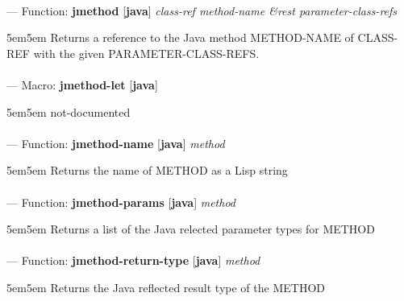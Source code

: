 \paragraph{}
\label{JAVA:JMETHOD}
--- Function: \textbf{jmethod} [\textbf{java}] \textit{class-ref method-name \&rest parameter-class-refs}

\begin{adjustwidth}{5em}{5em}
Returns a reference to the Java method METHOD-NAME of CLASS-REF with the given PARAMETER-CLASS-REFS.
\end{adjustwidth}

\paragraph{}
\label{JAVA:JMETHOD-LET}
--- Macro: \textbf{jmethod-let} [\textbf{java}] \textit{}

\begin{adjustwidth}{5em}{5em}
not-documented
\end{adjustwidth}

\paragraph{}
\label{JAVA:JMETHOD-NAME}
--- Function: \textbf{jmethod-name} [\textbf{java}] \textit{method}

\begin{adjustwidth}{5em}{5em}
Returns the name of METHOD as a Lisp string
\end{adjustwidth}

\paragraph{}
\label{JAVA:JMETHOD-PARAMS}
--- Function: \textbf{jmethod-params} [\textbf{java}] \textit{method}

\begin{adjustwidth}{5em}{5em}
Returns a list of the Java relected parameter types for METHOD
\end{adjustwidth}

\paragraph{}
\label{JAVA:JMETHOD-RETURN-TYPE}
--- Function: \textbf{jmethod-return-type} [\textbf{java}] \textit{method}

\begin{adjustwidth}{5em}{5em}
Returns the Java reflected result type of the METHOD
\end{adjustwidth}

